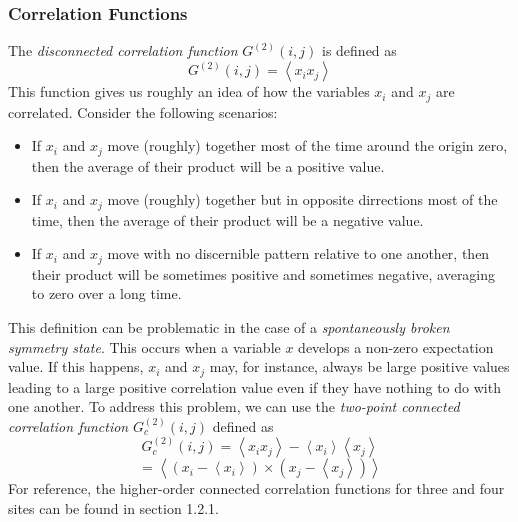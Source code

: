 \documentclass{article}
\begin{document}
\subsubsection{Correlation Functions}
The \emph{disconnected correlation function} $G^{(2)}(i,j)$ is defined as
$$G^{(2)}(i,j) = \left \langle x_{i}x_{j} \right \rangle$$
This function gives us roughly an idea of how the variables $x_{i}$ and $x_{j}$
are correlated. Consider the following scenarios:
\begin{itemize}
\item If $x_{i}$ and $x_{j}$ move (roughly) together most of the time around
the origin zero, then the average of their product will be a positive value.
\item If $x_{i}$ and $x_{j}$ move (roughly) together but in opposite dirrections
most of the time, then the average of their product will be a negative value.
\item If $x_{i}$ and $x_{j}$ move with no discernible pattern relative to one
another, then their product will be sometimes positive and sometimes negative,
averaging to zero over a long time.
\end{itemize}

This definition can be problematic in the case of a \emph{spontaneously
broken symmetry state}. This occurs when a variable $x$ develops a non-zero
expectation value. If this happens, $x_{i}$ and $x_{j}$ may, for instance,
always be large positive values leading to a large positive correlation value
even if they have nothing to do with one another. To address this problem, we
can use the \emph{two-point connected correlation function} $G_{c}^{(2)}(i,j)$
defined as
$$G_{c}^{(2)}(i,j) = \left \langle x_{i}x_{j} \right \rangle - \left \langle x_{i} \right \rangle \left \langle x_{j} \right \rangle$$
$$ = \left \langle (x_{i} - \left \langle x_{i} \right \rangle) \times (x_{j} - \left \langle x_{j} \right \rangle) \right \rangle $$
For reference, the higher-order connected correlation functions for three and four sites can be found in
section 1.2.1.
\end{document}
